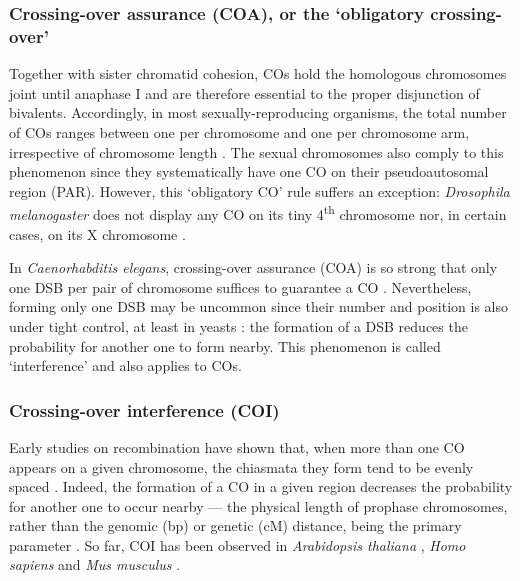 \subsubsection{Crossing-over assurance (COA), or the ‘obligatory crossing-over’}
Together with sister chromatid cohesion, COs hold the homologous chromosomes joint until anaphase I \citep[reviewed in][]{roeder1997meiotic} and are therefore essential to the proper disjunction of bivalents.
Accordingly, in most sexually-reproducing organisms, the total number of COs ranges between one per chromosome and one per chromosome arm, irrespective of chromosome length \citep{pardo-manueldevillena2001recombination,dumas2002chromosomal,hillers2003chromosomewide,dumont2017variation}. 
The sexual chromosomes also comply to this phenomenon since they systematically have one CO on their pseudoautosomal region (PAR).
However, this ‘obligatory CO’ rule suffers an exception: \textit{Drosophila melanogaster} does not display any CO on its tiny 4\textsuperscript{th} chromosome nor, in certain cases, on its X chromosome \citep{orr-weaver1995meiosis, koehler1998human}.

In \textit{Caenorhabditis elegans}, crossing-over assurance (COA) is so strong that only one DSB per pair of chromosome suffices to guarantee a CO \citep{rosu2011robust}.
Nevertheless, forming only one DSB may be uncommon since their number and position is also under tight control, at least in yeasts \citep{wu1995factors,fan1997competition,robine2007genomewide,anderson2015reduced}: the formation of a DSB reduces the probability for another one to form nearby. 
This phenomenon is called ‘interference’ and also applies to COs.



\subsubsection{Crossing-over interference (COI)}

Early studies on recombination \citep{sturtevant1915behavior,muller1916mechanism} have shown that, when more than one CO appears on a given chromosome, the chiasmata they form tend to be evenly spaced \citep{jones1967control, jones1974correlated, jones1984control,jones2006meiotic}.
Indeed, the formation of a CO in a given region decreases the probability for another one to occur nearby \citep{vanveen2003meiosis,hillers2004crossover} — the physical length of prophase chromosomes, rather than the genomic (bp) or genetic (cM) distance, being the primary parameter \citep{zhang2014crossover,wang2015meiotic}.
So far, COI has been observed in \textit{Arabidopsis thaliana} \citep{drouaud2007sexspecific}, \textit{Homo sapiens} \citep{laurie1985further,broman2000characterization} and \textit{Mus musculus} \citep{lawrie1995chiasma,anderson1999distribution,broman2002crossover}.\\

